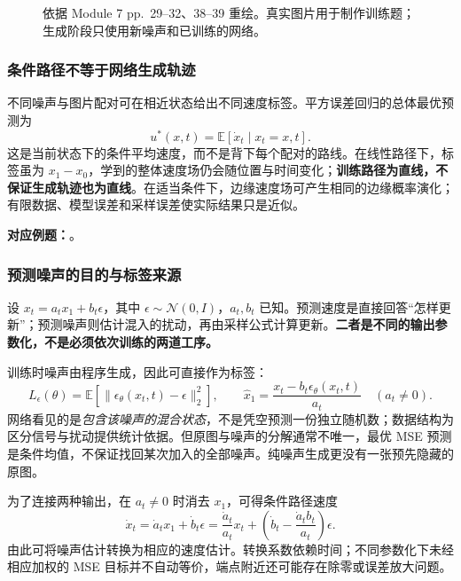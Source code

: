 \begin{figure}[htbp]
  \centering
  
  \caption{依据 Module 7 pp.~29--32、38--39 重绘。真实图片用于制作训练题；生成阶段只使用新噪声和已训练的网络。}
  \label{fig:sc3000-sup01-train-generate}
\end{figure}

\subsubsection*{条件路径不等于网络生成轨迹}

不同噪声与图片配对可在相近状态给出不同速度标签。平方误差回归的总体最优预测为
\[
  u^*(x,t)=\mathbb E[\dot x_t\mid x_t=x,t].
\]
这是当前状态下的条件平均速度，而不是背下每个配对的路线。在线性路径下，标签虽为 $x_1-x_0$，学到的整体速度场仍会随位置与时间变化；\textbf{训练路径为直线，不保证生成轨迹也为直线}。在适当条件下，边缘速度场可产生相同的边缘概率演化；有限数据、模型误差和采样误差使实际结果只是近似。

\textbf{对应例题：}。


\subsubsection*{预测噪声的目的与标签来源}

设 $x_t=a_t x_1+b_t\epsilon$，其中 $\epsilon\sim\mathcal N(0,I)$，$a_t,b_t$ 已知。预测速度是直接回答“怎样更新”；预测噪声则估计混入的扰动，再由采样公式计算更新。\textbf{二者是不同的输出参数化，不是必须依次训练的两道工序。}

训练时噪声由程序生成，因此可直接作为标签：
\[
  L_\epsilon(\theta)=\mathbb E
  \left[\|\epsilon_\theta(x_t,t)-\epsilon\|_2^2\right],\qquad
  \widehat x_1=\frac{x_t-b_t\epsilon_\theta(x_t,t)}{a_t}
  \quad(a_t\ne0).
\]
网络看见的是\emph{包含该噪声的混合状态}，不是凭空预测一份独立随机数；数据结构为区分信号与扰动提供统计依据。但原图与噪声的分解通常不唯一，最优 MSE 预测是条件均值，不保证找回某次加入的全部噪声。纯噪声生成更没有一张预先隐藏的原图。

为了连接两种输出，在 $a_t\ne0$ 时消去 $x_1$，可得条件路径速度
\[
  \dot x_t=\dot a_t x_1+\dot b_t\epsilon
  =\frac{\dot a_t}{a_t}x_t+
    \left(\dot b_t-\frac{\dot a_t b_t}{a_t}\right)\epsilon.
\]
由此可将噪声估计转换为相应的速度估计。转换系数依赖时间；不同参数化下未经相应加权的 MSE 目标并不自动等价，端点附近还可能存在除零或误差放大问题。

